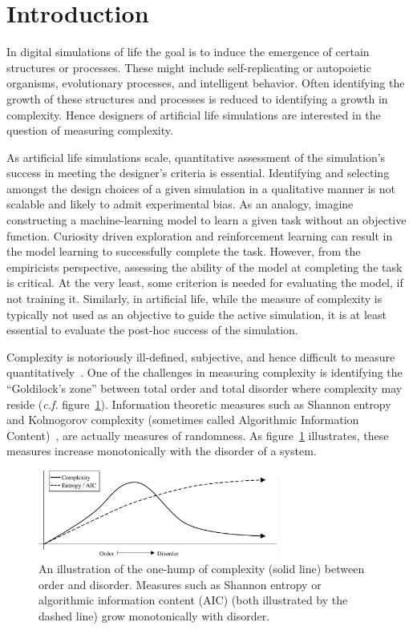 \section{Introduction}
\label{sec:intro}

In digital simulations of life the goal is to induce the emergence of certain
structures or processes. These might include self-replicating or autopoietic
organisms, evolutionary processes, and intelligent behavior. Often identifying
the growth of these structures and processes is reduced to identifying a growth
in complexity. Hence designers of artificial life simulations are interested in
the question of measuring complexity.

As artificial life simulations scale, quantitative assessment of the
simulation's success in meeting the designer's criteria is essential.
Identifying and selecting amongst the design choices of a given simulation in a
qualitative manner is not scalable and likely to admit experimental bias. As an
analogy, imagine constructing a machine-learning model to learn a given task
without an objective function. Curiosity driven exploration and reinforcement
learning can result in the model learning to successfully complete the task.
However, from the empiricists perspective, assessing the ability of the model
at completing the task is critical. At the very least, some criterion is needed
for evaluating the model, if not training it. Similarly, in artificial life,
while the measure of complexity is typically not used as an objective to guide
the active simulation, it is at least essential to evaluate the post-hoc
success of the simulation.

Complexity is notoriously ill-defined, subjective, and hence difficult to
measure quantitatively~\citep{gell2002complexity, mitchell2009complexity,
wiesner2019measuring}. One of the challenges in measuring complexity is
identifying the ``Goldilock's zone'' between total order and total disorder
where complexity may reside (\emph{c.f.}
figure~\ref{fig:complexity_and_entropy}). Information theoretic measures such
as Shannon entropy~\citep{shannon1948} and Kolmogorov complexity (sometimes
called Algorithmic Information Content)~\citep{kolmogorov1965, solomonoff1964},
are actually measures of randomness. As figure~\ref{fig:complexity_and_entropy}
illustrates, these measures increase monotonically with the disorder of a
system.

\begin{figure}
\centering
\includegraphics[width=0.7\textwidth]{figures/complexity_and_entropy}
\caption{An illustration of the one-hump of complexity (solid line) between
order and disorder. Measures such as Shannon entropy or algorithmic
information content (AIC) (both illustrated by the dashed line) grow
monotonically with disorder.}
\label{fig:complexity_and_entropy}
\end{figure}


